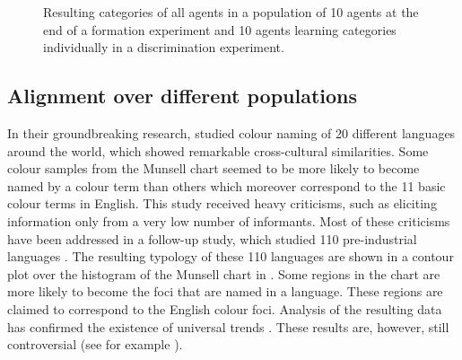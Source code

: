 \begin{figure}[htbp]
\centering
{}
\caption[Resulting categories of all agents in a population in a
formation experiment and a discrimination experiment]{Resulting
  categories of  all agents in
  a population of 10 agents at the end of a formation experiment and
   10 agents learning
  categories individually in a discrimination experiment.}
\label{f:language-categories}
\end{figure}

\subsection{Alignment over different populations}

In their groundbreaking research, \cite{berlin69basic} studied
colour naming of 20 different languages around the world, which showed
remarkable cross-cultural similarities. Some colour samples from the
Munsell chart seemed to be more likely to become named by a colour
term than others which moreover correspond to the 11 basic colour
terms in English. This study received heavy criticisms, such as
eliciting information only from a very low number of informants. Most
of these criticisms have been addressed in a follow-up study, which
studied 110 pre-industrial languages \citep{kay10world}. The resulting
typology of these 110 languages are shown in a contour plot over the
histogram of the Munsell chart in . Some
regions in the chart are more likely to become the foci that are named
in a language. These regions are claimed to correspond to the English
colour foci. Analysis of the resulting data has confirmed the
existence of universal trends \citep{regier05focal}. These results are,
however, still controversial (see for example \cite{roberson02color,
  roberson05color}).

